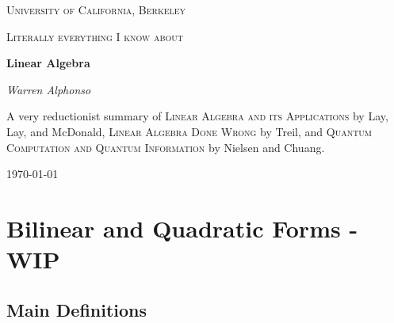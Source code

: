 \documentclass[a4paper,10pt]{book}
\theoremstyle{plain}
\theoremstyle{plain}
\theoremstyle{definition}
\begin{document}
\frontmatter 
{\let\cleardoublepage\clearpage 

\begin{titlepage}
	\centering
	\vspace{1cm}
	{\scshape\LARGE University of California, Berkeley \par}
	\vspace{4cm}
	{\scshape\Large Literally everything I know about \par}
	\vspace{1.5cm}
	{\Huge\bfseries Linear Algebra\par}
	\vspace{1cm}
	\vspace{2.5cm}
	{\Large\itshape Warren Alphonso\par}
	\vfill
	{\large A very reductionist summary of \textsc{Linear Algebra and its Applications} by Lay, Lay, and McDonald, \textsc{Linear Algebra Done Wrong} by Treil, and \textsc{Quantum Computation and Quantum Information} by Nielsen and Chuang. \par}
	\vfill
	{\large \today\par}
\end{titlepage}

\tableofcontents
}

\mainmatter






































\chapter{Bilinear and Quadratic Forms - WIP}

\section{Main Definitions}
\end{document}
